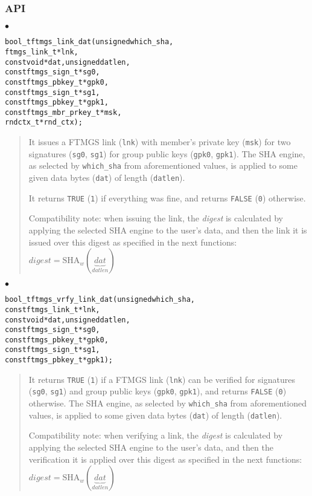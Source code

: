 \documentclass[a4paper]{article}
\newenvironment{api}%
{\noindent$\bullet$\hfill\begin{minipage}[t]{0.97\linewidth}\footnotesize\begin{alltt}}%
{\end{alltt}\end{minipage}}%
\begin{document}
\subsubsection*{API}
\begin{api}
bool_t ftmgs_link_dat(unsigned which_sha,
                      ftmgs_link_t* lnk,
                      const void* dat, unsigned datlen,
                      const ftmgs_sign_t* sg0,
                      const ftmgs_pbkey_t* gpk0,
                      const ftmgs_sign_t* sg1,
                      const ftmgs_pbkey_t* gpk1,
                      const ftmgs_mbr_prkey_t* msk,
                      rndctx_t* rnd_ctx);
\end{api}
\begin{quote}\footnotesize
It issues a FTMGS link (\verb|lnk|) with member's private key
(\verb|msk|) for two signatures (\verb|sg0|, \verb|sg1|) for group public keys
(\verb|gpk0|, \verb|gpk1|). The SHA engine, as selected by
\verb|which_sha| from aforementioned values, is applied to some given
data bytes (\verb|dat|) of length (\verb|datlen|).

It returns \verb|TRUE| (\verb|1|) if everything was fine, and returns
\verb|FALSE| (\verb|0|) otherwise.

Compatibility note: when issuing the link, the \emph{digest} is
calculated by applying the selected SHA engine to the user's data, and
then the link it is issued over this digest as specified in
the next functions:\\
{$\mathit{digest} = \mathrm{SHA}_w(\underbrace{\mathit{dat}}_{\mathit{datlen}})$}
\end{quote}
\begin{api}
bool_t ftmgs_vrfy_link_dat(unsigned which_sha,
                           const ftmgs_link_t* lnk,
                           const void* dat, unsigned datlen,
                           const ftmgs_sign_t* sg0,
                           const ftmgs_pbkey_t* gpk0,
                           const ftmgs_sign_t* sg1,
                           const ftmgs_pbkey_t* gpk1);
\end{api}
\begin{quote}\footnotesize
It returns \verb|TRUE| (\verb|1|) if a FTMGS link (\verb|lnk|) can be
verified for signatures (\verb|sg0|, \verb|sg1|) and group public keys
(\verb|gpk0|, \verb|gpk1|), and returns \verb|FALSE| (\verb|0|)
otherwise. The SHA engine, as selected by \verb|which_sha| from
aforementioned values, is applied to some given data bytes
(\verb|dat|) of length (\verb|datlen|).

Compatibility note: when verifying a link, the \emph{digest} is
calculated by applying the selected SHA engine to the user's data, and
then the verification it is applied over this digest as specified in
the next functions:\\
{$\mathit{digest} = \mathrm{SHA}_w(\underbrace{\mathit{dat}}_{\mathit{datlen}})$}
\end{quote}
\end{document}

